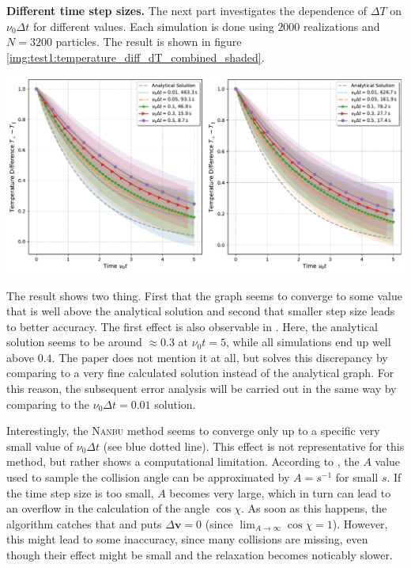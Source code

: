 \textbf{Different time step sizes.} The next part investigates the dependence of $\Delta T$ on $\nu_0\Delta t$ for different values. Each simulation is done using $2000$ realizations and $N=3200$ particles. The result is shown in figure \ref{img:test1:temperature_diff_dT_combined_shaded}. \\
\begin{minipage}[h]{\linewidth}
    \vspace{5pt}
    \centering
    \includegraphics[width=\linewidth]{ressources/test1/temperature_diff_dT_combined_shaded.pdf}
    \label{img:test1:temperature_diff_dT_combined_shaded}
    \vspace{5pt}
\end{minipage}
The result shows two thing. First that the graph seems to converge to some value that is well above the analytical solution and second that smaller step size leads to better accuracy. The first effect is also observable in \cite[4313--4314]{Wang2008}. Here, the analytical solution seems to be around $\approx 0.3$ at $\nu_0t = 5$, while all simulations end up well above $0.4$. The paper does not mention it at all, but solves this discrepancy by comparing to a very fine calculated solution instead of the analytical graph. For this reason, the subsequent error analysis will be carried out in the same way by comparing to the $\nu_0\Delta t = 0.01$ solution.

Interestingly, the \textsc{Nanbu} method seems to converge only up to a specific very small value of $\nu_0\Delta t$ (see blue dotted line). This effect is not representative for this method, but rather shows a computational limitation. According to \cite[4645]{Nanbu1997}, the $A$ value used to sample the collision angle can be approximated by $A = s^{-1}$ for small $s$. If the time step size is too small, $A$ becomes very large, which in turn can lead to an overflow in the calculation of the angle $\cos \chi$. As soon as this happens, the algorithm catches that and puts $\Delta \mathbf{v} = 0$ (since $\lim_{A \rightarrow \infty} \cos\chi = 1$). However, this might lead to some inaccuracy, since many collisions are missing, even though their effect might be small and the relaxation becomes noticably slower.

